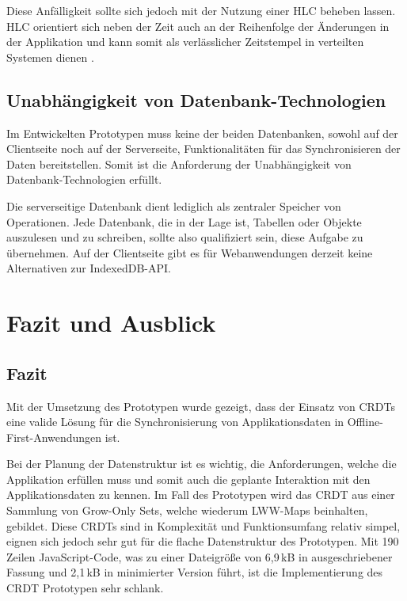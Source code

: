 \documentclass[a4paper, 12pt]{scrreprt}
\begin{document}
Diese Anfälligkeit sollte sich jedoch mit der Nutzung einer \ac{HLC} beheben lassen. \ac{HLC} orientiert sich neben der Zeit auch an der Reihenfolge der Änderungen in der Applikation und kann somit als verlässlicher Zeitstempel in verteilten Systemen dienen \autocite[S. 1]{InproceedingsHLC}. 


\section{Unabhängigkeit von Datenbank-Technologien}

Im Entwickelten Prototypen muss keine der beiden Datenbanken, sowohl auf der Clientseite noch auf der Serverseite, Funktionalitäten für das Synchronisieren der Daten bereitstellen. Somit ist die Anforderung der Unabhängigkeit von Datenbank-Technologien erfüllt. 

Die serverseitige Datenbank dient lediglich als zentraler Speicher von Operationen. Jede Datenbank, die in der Lage ist, Tabellen oder Objekte auszulesen und zu schreiben, sollte also qualifiziert sein, diese Aufgabe zu übernehmen. Auf der Clientseite gibt es für Webanwendungen derzeit keine Alternativen zur IndexedDB-API. 


\chapter{Fazit und Ausblick}

\section{Fazit}

Mit der Umsetzung des Prototypen wurde gezeigt, dass der Einsatz von CRDTs eine valide Lösung für die Synchronisierung von Applikationsdaten in Offline-First-Anwendungen ist.

Bei der Planung der Datenstruktur ist es wichtig, die Anforderungen, welche die Applikation erfüllen muss und somit auch die geplante Interaktion mit den Applikationsdaten zu kennen. Im Fall des Prototypen wird das CRDT aus einer Sammlung von Grow-Only Sets, welche wiederum LWW-Maps beinhalten, gebildet. Diese CRDTs sind in Komplexität und Funktionsumfang relativ simpel, eignen sich jedoch sehr gut für die flache Datenstruktur des Prototypen. Mit 190 Zeilen JavaScript-Code, was zu einer Dateigröße von 6,9\,kB in ausgeschriebener Fassung und 2,1\,kB in minimierter Version führt, ist die Implementierung des CRDT Prototypen sehr schlank.
\end{document}
